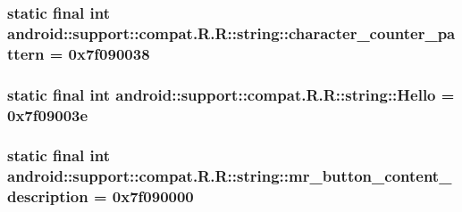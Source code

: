 \hypertarget{classandroid_1_1support_1_1compat_1_1_r_1_1string_f128a62845301698b1f08353d80a78a4}{
\subsubsection[{character\_\-counter\_\-pattern}]{\setlength{\rightskip}{0pt plus 5cm}static final int android::support::compat.R.R::string::character\_\-counter\_\-pattern = 0x7f090038}}
\label{classandroid_1_1support_1_1compat_1_1_r_1_1string_f128a62845301698b1f08353d80a78a4}


\hypertarget{classandroid_1_1support_1_1compat_1_1_r_1_1string_81f358d0d18bc6f994bc930e7be4ebba}{
\subsubsection[{Hello}]{\setlength{\rightskip}{0pt plus 5cm}static final int android::support::compat.R.R::string::Hello = 0x7f09003e}}
\label{classandroid_1_1support_1_1compat_1_1_r_1_1string_81f358d0d18bc6f994bc930e7be4ebba}


\hypertarget{classandroid_1_1support_1_1compat_1_1_r_1_1string_b4e352eabcd465c7b01b4ca3da61b125}{
\subsubsection[{mr\_\-button\_\-content\_\-description}]{\setlength{\rightskip}{0pt plus 5cm}static final int android::support::compat.R.R::string::mr\_\-button\_\-content\_\-description = 0x7f090000}}
\label{classandroid_1_1support_1_1compat_1_1_r_1_1string_b4e352eabcd465c7b01b4ca3da61b125}


